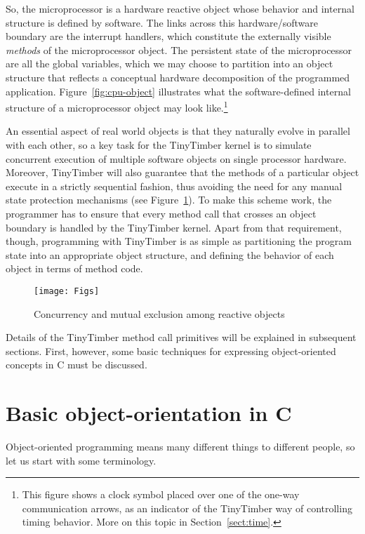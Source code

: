 \documentclass[12pt]{article}
\begin{document}
So, the microprocessor is a hardware reactive object whose behavior and internal structure is defined by software.  The links across this hardware/software boundary are the interrupt handlers, which constitute the externally visible {\em methods} of the microprocessor object.  The persistent state of the microprocessor are all the global variables, which we may choose to partition into an object structure that reflects a conceptual hardware decomposition of the programmed application. Figure~\ref{fig:cpu-object} illustrates what the software-defined internal structure of a microprocessor object may look like.\footnote{This figure shows a clock symbol placed over one of the one-way communication arrows, as an indicator of the TinyTimber way of controlling timing behavior. More on this topic in Section~\ref{sect:time}.}

An essential aspect of real world objects is that they naturally evolve in parallel with each other, so a key task for the TinyTimber kernel is to simulate concurrent execution of multiple software objects on single processor hardware.  Moreover, TinyTimber will also guarantee that the methods of a particular object execute in a strictly sequential fashion, thus avoiding the need for any manual state protection mechanisms (see Figure~\ref{fig:concurrency}).  To make this scheme work, the programmer has to ensure that every method call that crosses an object boundary is handled by the TinyTimber kernel.  Apart from that requirement, though, programming with TinyTimber is as simple as partitioning the program state into an appropriate object structure, and defining the behavior of each object in terms of method code.

\begin{figure}
\texttt{[image: Figs]}
\caption{\label{fig:concurrency}Concurrency and mutual exclusion among reactive objects}
\end{figure}

Details of the TinyTimber method call primitives will be explained in subsequent sections.  First, however, some basic techniques for expressing object-oriented concepts in C must be discussed.

\section{Basic object-orientation in C}
\label{sect:basic-oo}

Object-oriented programming means many different things to different people, so let us start with some terminology.
\end{document}
